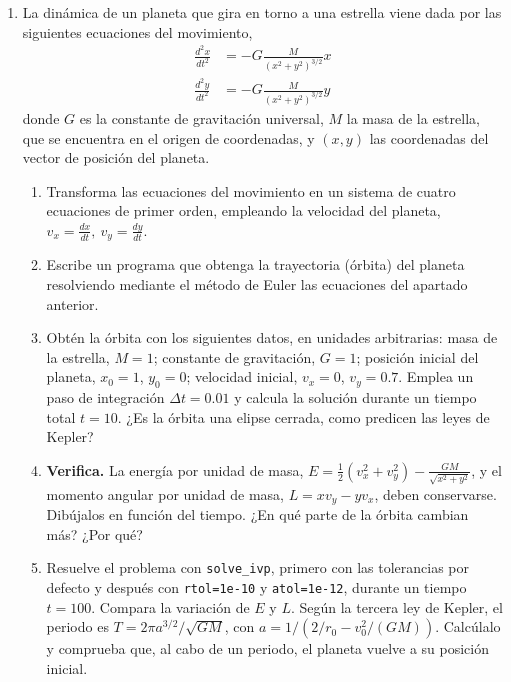 \begin{enumerate}
\item \label{ej:orbita} La dinámica de un planeta que gira en torno a una estrella viene dada por las siguientes ecuaciones del movimiento,
\begin{align*}
\frac{d^2x}{dt^2} &= -G\frac{M}{(x^2+y^2)^{3/2}}x\\
\frac{d^2y}{dt^2} &= -G\frac{M}{(x^2+y^2)^{3/2}}y
\end{align*}
donde $G$ es la constante de gravitación universal, $M$ la masa de la estrella, que se encuentra en el origen de coordenadas, y $(x,y)$ las coordenadas del vector de posición del planeta.
\begin{enumerate}
\item Transforma las ecuaciones del movimiento en un sistema de cuatro ecuaciones de primer orden, empleando la velocidad del planeta, $v_x = \frac{dx}{dt},\ v_y = \frac{dy}{dt}$.
\item Escribe un programa que obtenga la trayectoria (órbita) del planeta resolviendo mediante el método de Euler las ecuaciones del apartado anterior.
\item Obtén la órbita con los siguientes datos, en unidades arbitrarias: masa de la estrella, $M=1$; constante de gravitación, $G=1$; posición inicial del planeta, $x_0 = 1$, $y_0=0$; velocidad inicial, $v_x = 0$, $v_y = 0.7$. Emplea un paso de integración $\Delta t =0.01$ y calcula la solución durante un tiempo total $t = 10$. ¿Es la órbita una elipse cerrada, como predicen las leyes de Kepler?
\item \textbf{Verifica.} La energía por unidad de masa, $E=\frac12(v_x^2+v_y^2)-\frac{GM}{\sqrt{x^2+y^2}}$, y el momento angular por unidad de masa, $L=xv_y-yv_x$, deben conservarse. Dibújalos en función del tiempo. ¿En qué parte de la órbita cambian más? ¿Por qué?
\item Resuelve el problema con \texttt{solve\_ivp}, primero con las tolerancias por defecto y después con \texttt{rtol=1e-10} y \texttt{atol=1e-12}, durante un tiempo $t=100$. Compara la variación de $E$ y $L$. Según la tercera ley de Kepler, el periodo es $T=2\pi a^{3/2}/\sqrt{GM}$, con $a=1/\left(2/r_0-v_0^2/(GM)\right)$. Calcúlalo y comprueba que, al cabo de un periodo, el planeta vuelve a su posición inicial.
\end{enumerate}


\end{enumerate}
